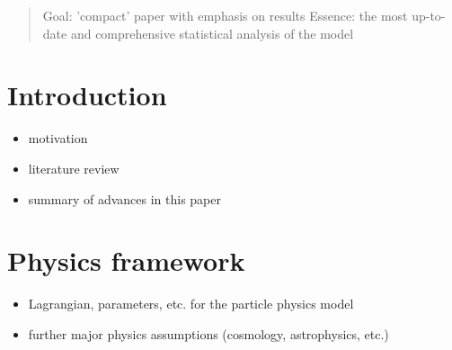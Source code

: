 
\date{\today}


\newcommand{\DB}{\mbox{\sf DarkBit}}
\newcommand{\GB}{\mbox{\sf GAMBIT}}


\maketitle

\begin{abstract}

Goal: 'compact' paper with emphasis on results
Essence: the most up-to-date and comprehensive statistical analysis of the model

\end{abstract}

\section{Introduction}
\label{intro}

\begin{itemize}
  \item motivation
  \item literature review
  \item summary of advances in this paper
\end{itemize}

\section{Physics framework}
\label{phys}


\begin{itemize}
           \item Lagrangian, parameters, etc. for the particle physics model
           \item further major physics assumptions (cosmology, astrophysics, etc.)
\end{itemize}



